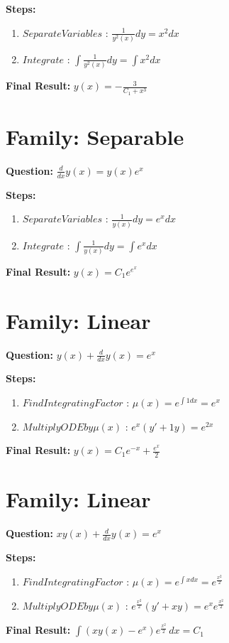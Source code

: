 \documentclass{article}
\begin{document}
\textbf{Steps:}
\begin{enumerate}
\item $Separate Variables$ :  $\frac{1}{y^{2}{\left(x \right)}} dy = x^{2} dx$
\item $Integrate$ :  $\int \frac{1}{y^{2}{\left(x \right)}} dy = \int x^{2} dx$
\end{enumerate}
\textbf{Final Result:} $y{\left(x \right)} = - \frac{3}{C_{1} + x^{3}}$

\section*{Family: Separable}
\textbf{Question:} $\frac{d}{d x} y{\left(x \right)} = y{\left(x \right)} e^{x}$

\textbf{Steps:}
\begin{enumerate}
\item $Separate Variables$ :  $\frac{1}{y{\left(x \right)}} dy = e^{x} dx$
\item $Integrate$ :  $\int \frac{1}{y{\left(x \right)}} dy = \int e^{x} dx$
\end{enumerate}
\textbf{Final Result:} $y{\left(x \right)} = C_{1} e^{e^{x}}$

\section*{Family: Linear}
\textbf{Question:} $y{\left(x \right)} + \frac{d}{d x} y{\left(x \right)} = e^{x}$

\textbf{Steps:}
\begin{enumerate}
\item $Find Integrating Factor$ :  $\mu(x) = e^{\int 1 dx} = e^{x}$
\item $Multiply ODE by \mu(x)$ :  $e^{x}(y' + 1y) = e^{2 x}$
\end{enumerate}
\textbf{Final Result:} $y{\left(x \right)} = C_{1} e^{- x} + \frac{e^{x}}{2}$

\section*{Family: Linear}
\textbf{Question:} $x y{\left(x \right)} + \frac{d}{d x} y{\left(x \right)} = e^{x}$

\textbf{Steps:}
\begin{enumerate}
\item $Find Integrating Factor$ :  $\mu(x) = e^{\int x dx} = e^{\frac{x^{2}}{2}}$
\item $Multiply ODE by \mu(x)$ :  $e^{\frac{x^{2}}{2}}(y' + xy) = e^{x} e^{\frac{x^{2}}{2}}$
\end{enumerate}
\textbf{Final Result:} $\int \left(x y{\left(x \right)} - e^{x}\right) e^{\frac{x^{2}}{2}}\, dx = C_{1}$
\end{document}
